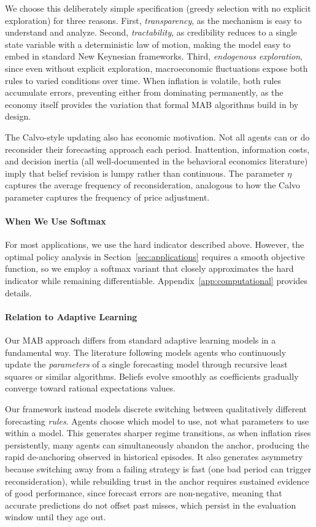 \documentclass[10pt]{article}
\begin{document}
We choose this deliberately simple specification (greedy selection with no explicit exploration) for three reasons. First, \textit{transparency}, as the mechanism is easy to understand and analyze. Second, \textit{tractability}, as credibility reduces to a single state variable with a deterministic law of motion, making the model easy to embed in standard New Keynesian frameworks. Third, \textit{endogenous exploration}, since even without explicit exploration, macroeconomic fluctuations expose both rules to varied conditions over time. When inflation is volatile, both rules accumulate errors, preventing either from dominating permanently, as the economy itself provides the variation that formal MAB algorithms build in by design.

The Calvo-style updating also has economic motivation. Not all agents can or do reconsider their forecasting approach each period. Inattention, information costs, and decision inertia (all well-documented in the behavioral economics literature) imply that belief revision is lumpy rather than continuous. The parameter $\eta$ captures the average frequency of reconsideration, analogous to how the Calvo parameter captures the frequency of price adjustment.

\paragraph{When We Use Softmax} For most applications, we use the hard indicator described above. However, the optimal policy analysis in Section~\ref{sec:applications} requires a smooth objective function, so we employ a softmax variant that closely approximates the hard indicator while remaining differentiable. Appendix~\ref{app:computational} provides details.

\paragraph{Relation to Adaptive Learning} Our MAB approach differs from standard adaptive learning models in a fundamental way. The literature following \citet{evans2001learning} models agents who continuously update the \textit{parameters} of a single forecasting model through recursive least squares or similar algorithms. Beliefs evolve smoothly as coefficients gradually converge toward rational expectations values.

Our framework instead models discrete switching between qualitatively different forecasting \textit{rules}. Agents choose which model to use, not what parameters to use within a model. This generates sharper regime transitions, as when inflation rises persistently, many agents can simultaneously abandon the anchor, producing the rapid de-anchoring observed in historical episodes. It also generates asymmetry because switching away from a failing strategy is fast (one bad period can trigger reconsideration), while rebuilding trust in the anchor requires sustained evidence of good performance, since forecast errors are non-negative, meaning that accurate predictions do not offset past misses, which persist in the evaluation window until they age out.
\end{document}
